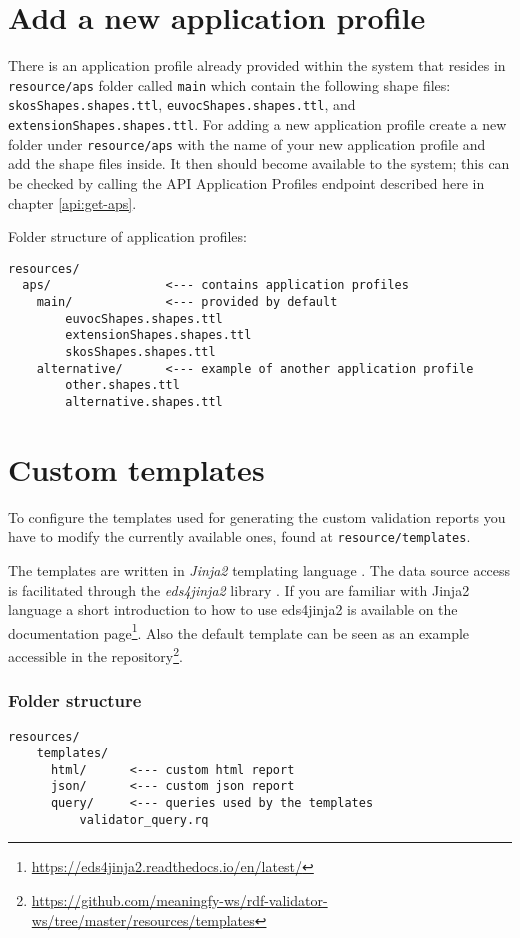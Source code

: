 \section{Add a new application profile}

There is an application profile already provided within the system that resides in \texttt{resource\slash aps} folder called \texttt{main} which contain the following shape files: \texttt{skosShapes.shapes.ttl}, \texttt{euvocShapes.shapes.ttl}, and \texttt{extensionShapes.shapes.ttl}. For adding a new application profile create a new folder under \texttt{resource\slash aps} with the name of your new application profile and add the shape files inside. It then should become available to the system; this can be checked by calling the API Application Profiles endpoint described here in chapter \ref{api:get-aps}.

Folder structure of application profiles:

\begin{lstlisting}
resources/
  aps/                <--- contains application profiles
    main/             <--- provided by default
        euvocShapes.shapes.ttl
        extensionShapes.shapes.ttl
        skosShapes.shapes.ttl
    alternative/      <--- example of another application profile
        other.shapes.ttl
        alternative.shapes.ttl
\end{lstlisting}


\section{Custom templates}

To configure the templates used for generating the custom validation reports you have to modify the currently available ones, found at \texttt{resource\slash templates}. 

The templates are written in \textit{Jinja2} templating language \citep{jinja2}. The data source access is facilitated through the \textit{eds4jinja2} library \citep{eds4jinja2}. If you are familiar with Jinja2 language a short introduction to how to use eds4jinja2 is available on the documentation page\footnote{\url{https://eds4jinja2.readthedocs.io/en/latest/}}. Also the default template can be seen as an example accessible in the repository\footnote{\url{https://github.com/meaningfy-ws/rdf-validator-ws/tree/master/resources/templates}}.

\subsubsection{Folder structure}
\begin{lstlisting}
resources/
    templates/          
      html/      <--- custom html report
      json/      <--- custom json report
      query/     <--- queries used by the templates
          validator_query.rq
\end{lstlisting}

